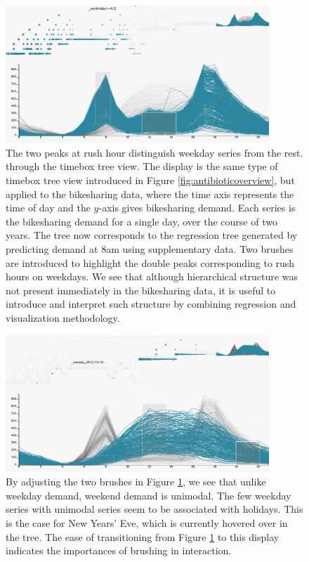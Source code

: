 \documentclass[12pt]{article}
\begin{document}
\begin{figure}

{\centering \includegraphics[width=375px]{figure/working}

}

\caption{The two peaks at rush hour distinguish weekday series from the rest.
  through the timebox tree view. The display is the same type of timebox tree
  view introduced in Figure \ref{fig:antibioticoverview}, but applied to the
  bikesharing data, where the time axis represents the time of day and the
  $y$-axis gives bikesharing demand. Each series is the bikesharing demand for a
  single day, over the course of two years. The tree now corresponds to the
  regression tree generated by predicting demand at 8am using supplementary
  data. Two brushes are introduced to highlight the double peaks corresponding
  to rush hours on weekdays. We see that although hierarchical structure was not
  present immediately in the bikesharing data, it is useful to introduce and
  interpret such structure by combining regression and visualization
  methodology.
}\label{fig:working}
\end{figure}

\begin{figure}
  \centering
  \includegraphics[width=375px]{figure/weekend}
    \caption{By adjusting the two brushes in Figure \ref{fig:working}, we see that
      unlike weekday demand, weekend demand is unimodal. The few weekday series with
      unimodal series seem to be associated with holidays. This is the case for New
      Years' Eve, which is currently hovered over in the tree. The ease of
      transitioning from Figure \ref{fig:working} to this display indicates the
      importances of brushing in interaction.}\label{fig:weekend}
\end{figure}
\end{document}
